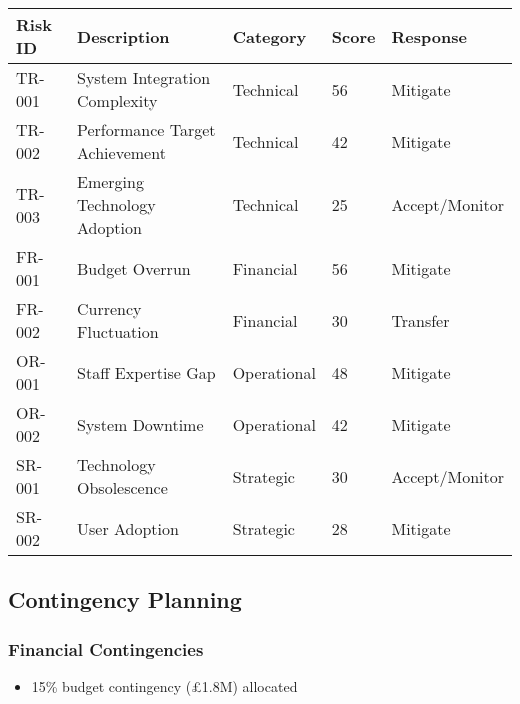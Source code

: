 \begin{center}
\begin{tabular}{@{}p{2cm}p{5cm}p{2cm}p{2cm}p{2.5cm}@{}}
\toprule
\textbf{Risk ID} & \textbf{Description} & \textbf{Category} & \textbf{Score} & \textbf{Response} \\
\midrule
TR-001 & System Integration Complexity & Technical & 56 & Mitigate \\
TR-002 & Performance Target Achievement & Technical & 42 & Mitigate \\
TR-003 & Emerging Technology Adoption & Technical & 25 & Accept/Monitor \\
FR-001 & Budget Overrun & Financial & 56 & Mitigate \\
FR-002 & Currency Fluctuation & Financial & 30 & Transfer \\
OR-001 & Staff Expertise Gap & Operational & 48 & Mitigate \\
OR-002 & System Downtime & Operational & 42 & Mitigate \\
SR-001 & Technology Obsolescence & Strategic & 30 & Accept/Monitor \\
SR-002 & User Adoption & Strategic & 28 & Mitigate \\
\bottomrule
\end{tabular}
\end{center}

\subsection{Contingency Planning}

\subsubsection{Financial Contingencies}
\begin{itemize}
\item 15\% budget contingency (£1.8M) allocated
\item Phased deployment option if budget constraints arise
\item Value engineering process to reduce costs without compromising core functionality
\item Option to lease rather than purchase certain components
\end{itemize}

\subsubsection{Technical Contingencies}
\begin{itemize}
\item Fallback to proven technologies if cutting-edge solutions fail
\item Modular design allowing incremental deployment
\item Multiple vendor options for critical components
\item Compatibility with industry-standard protocols
\end{itemize}

